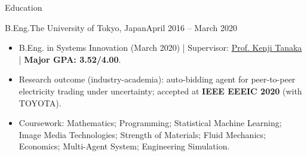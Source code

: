 \documentclass[]{mcdowellcv}
\begin{document}
\begin{cvsection}{Education}
  \begin{cvsubsection}{B.Eng.}{The University of Tokyo, Japan}{April 2016 -- March 2020}
    \begin{itemize}
      \item B.Eng. in Systems Innovation (March 2020) | Supervisor: \href{https://scholar.google.co.jp/citations?hl=en&user=FhECBzMAAAAJ}{Prof. Kenji Tanaka} | \textbf{Major GPA: 3.52/4.00}.
      \item Research outcome (industry-academia): auto-bidding agent for peer-to-peer electricity trading under uncertainty; accepted at \textbf{IEEE EEEIC 2020} (with TOYOTA).
      \item Coursework: Mathematics; Programming; Statistical Machine Learning; Image Media Technologies; Strength of Materials; Fluid Mechanics; Economics; Multi-Agent System; Engineering Simulation.
    \end{itemize}
  \end{cvsubsection}
\end{cvsection}
\end{document}

